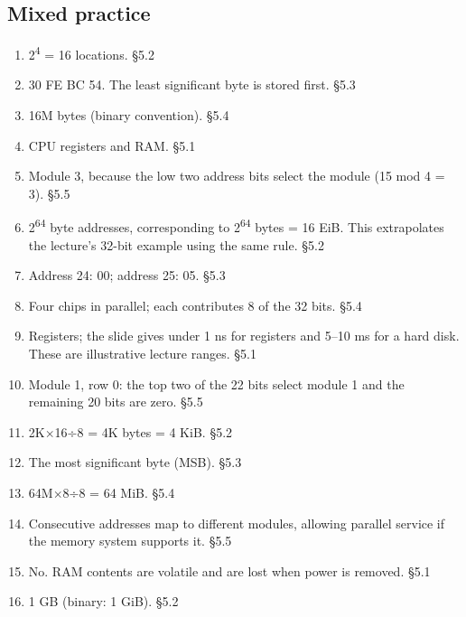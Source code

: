 \documentclass[11pt]{article}
\begin{document}
\begin{keepsection}\subsection{Mixed practice}

\begin{enumerate}
\item 2\textsuperscript{4} = 16 locations. \hfill{\small\color{FAUblue}§5.2}
\item 30 FE BC 54. The least significant byte is stored first. \hfill{\small\color{FAUblue}§5.3}
\item 16M bytes (binary convention). \hfill{\small\color{FAUblue}§5.4}
\item CPU registers and RAM. \hfill{\small\color{FAUblue}§5.1}
\item Module 3, because the low two address bits select the module (15 mod 4 = 3). \hfill{\small\color{FAUblue}§5.5}
\item 2\textsuperscript{64} byte addresses, corresponding to 2\textsuperscript{64} bytes = 16 EiB. This extrapolates the lecture’s 32-bit example using the same rule. \hfill{\small\color{FAUblue}§5.2}
\item Address 24: 00; address 25: 05. \hfill{\small\color{FAUblue}§5.3}
\item Four chips in parallel; each contributes 8 of the 32 bits. \hfill{\small\color{FAUblue}§5.4}
\item Registers; the slide gives under 1 ns for registers and 5–10 ms for a hard disk. These are illustrative lecture ranges. \hfill{\small\color{FAUblue}§5.1}
\item Module 1, row 0: the top two of the 22 bits select module 1 and the remaining 20 bits are zero. \hfill{\small\color{FAUblue}§5.5}
\item 2K\ensuremath{\times}16÷8 = 4K bytes = 4 KiB. \hfill{\small\color{FAUblue}§5.2}
\item The most significant byte (MSB). \hfill{\small\color{FAUblue}§5.3}
\item 64M\ensuremath{\times}8÷8 = 64 MiB. \hfill{\small\color{FAUblue}§5.4}
\item Consecutive addresses map to different modules, allowing parallel service if the memory system supports it. \hfill{\small\color{FAUblue}§5.5}
\item No. RAM contents are volatile and are lost when power is removed. \hfill{\small\color{FAUblue}§5.1}
\item 1 GB (binary: 1 GiB). \hfill{\small\color{FAUblue}§5.2}

\end{enumerate}
\end{keepsection}
\end{document}
